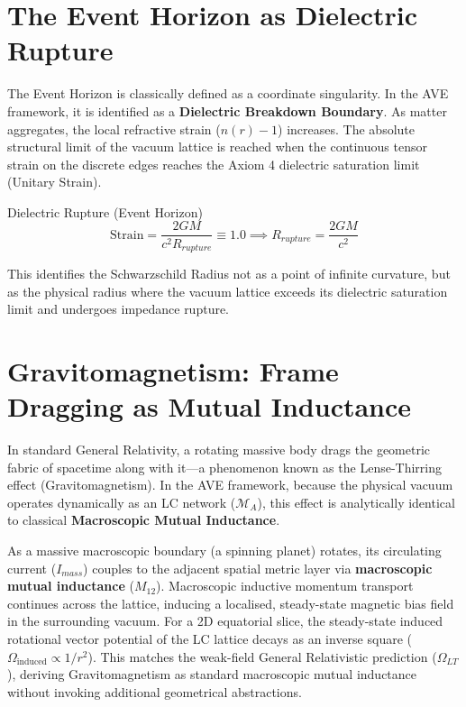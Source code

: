 \section{The Event Horizon as Dielectric Rupture}
\label{sec:dielectric_rupture}

The Event Horizon is classically defined as a coordinate singularity. In the AVE framework, it is identified as a \textbf{Dielectric Breakdown Boundary}. As matter aggregates, the local refractive strain ($n(r)-1$) increases. The absolute structural limit of the vacuum lattice is reached when the continuous tensor strain on the discrete edges reaches the Axiom 4 dielectric saturation limit (Unitary Strain).
\begin{resultbox}{Dielectric Rupture (Event Horizon)}
\begin{equation}
    \text{Strain} = \frac{2GM}{c^2 R_{rupture}} \equiv 1.0 \implies R_{rupture} = \frac{2GM}{c^2}
\end{equation}
\end{resultbox}
This identifies the Schwarzschild Radius not as a point of infinite curvature, but as the physical radius where the vacuum lattice exceeds its dielectric saturation limit and undergoes impedance rupture.

\section{Gravitomagnetism: Frame Dragging as Mutual Inductance}
\label{sec:gravitomagnetism_viscosity}
In standard General Relativity, a rotating massive body drags the geometric fabric of spacetime along with it—a phenomenon known as the Lense-Thirring effect (Gravitomagnetism). In the AVE framework, because the physical vacuum operates dynamically as an LC network ($\mathcal{M}_A$), this effect is analytically identical to classical \textbf{Macroscopic Mutual Inductance}.

As a massive macroscopic boundary (a spinning planet) rotates, its circulating current ($I_{mass}$) couples to the adjacent spatial metric layer via \textbf{macroscopic mutual inductance} ($M_{12}$). Macroscopic inductive momentum transport continues across the lattice, inducing a localised, steady-state magnetic bias field in the surrounding vacuum. For a 2D equatorial slice, the steady-state induced rotational vector potential of the LC lattice decays as an inverse square ($\Omega_{\text{induced}} \propto 1/r^2$). This matches the weak-field General Relativistic prediction ($\Omega_{LT}$), deriving Gravitomagnetism as standard macroscopic mutual inductance without invoking additional geometrical abstractions.

